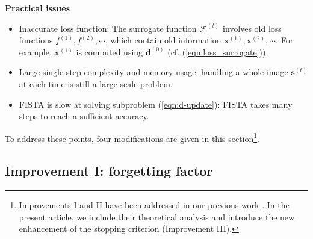 \documentclass[final]{siamart1116}
\newcommand{\mb}[1]{\mathbf{#1}}
\def \F  {\mathcal{F}}
\begin{document}
\textbf{Practical issues}
\begin{itemize}
\item Inaccurate loss function: The surrogate function $\F^{(t)}$ involves old loss functions $f^{(1)}, f^{(2)}, \cdots$, which contain old information $\mb{x}^{(1)}, \mb{x}^{(2)},\cdots$. For example, $\mb{x}^{(1)}$ is computed using $\mb{d}^{(0)}$ (cf.  (\ref{eqn:loss_surrogate})).
\item Large single step complexity and memory usage: handling a whole image $\mb{s}^{(t)}$ at each time is still a large-scale problem.
\item FISTA is slow at solving subproblem (\ref{eqn:d-update}): FISTA takes many steps to reach a sufficient accuracy.
\end{itemize}
To address these points, four modifications are given in this section\footnote{Improvements I and II have been addressed in our previous work \cite{liu-2017-online}. In the present article, we include their theoretical analysis and introduce the new enhancement of the stopping criterion (Improvement III).}.


\subsection{Improvement I: forgetting factor}
\label{para:modify}
\end{document}
